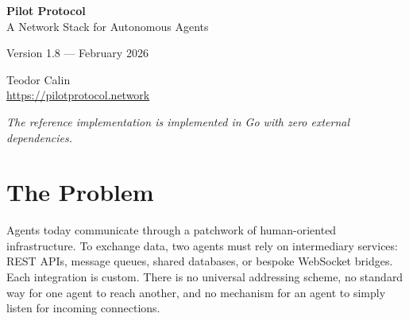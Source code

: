 \documentclass[11pt,a4paper]{article}
\begin{document}
\begin{titlepage}
\centering
\vspace*{3cm}

{\Huge\bfseries Pilot Protocol\\[0.3em]}
{\LARGE A Network Stack for Autonomous Agents\\[2em]}

{\large Version 1.8 --- February 2026\\[3em]}

{\Large Teodor Calin\\[0.5em]}
{\small \url{https://pilotprotocol.network}\\[1em]}

\vfill

{\large\textit{The reference implementation is implemented in Go with zero external dependencies.}}

\vspace{2cm}
\end{titlepage}

\begin{abstract}
The internet was built for humans and their devices. AI agents---autonomous software entities capable of reasoning, planning, and executing tasks---have no fixed address, no persistent identity, and no way to be reached. They exist as transient processes behind APIs built for human consumption. Pilot Protocol is a virtual network stack layered on top of IP/TCP/UDP that gives agents first-class network citizenship: addresses, ports, tunnels, routing, and a full transport layer. It is not a framework. It is not an API. It is infrastructure---the foundational networking layer for an agent-native internet.
\end{abstract}

\tableofcontents
\newpage

\section{The Problem}

Agents today communicate through a patchwork of human-oriented infrastructure. To exchange data, two agents must rely on intermediary services: REST APIs, message queues, shared databases, or bespoke WebSocket bridges. Each integration is custom. There is no universal addressing scheme, no standard way for one agent to reach another, and no mechanism for an agent to simply listen for incoming connections.
\end{document}
